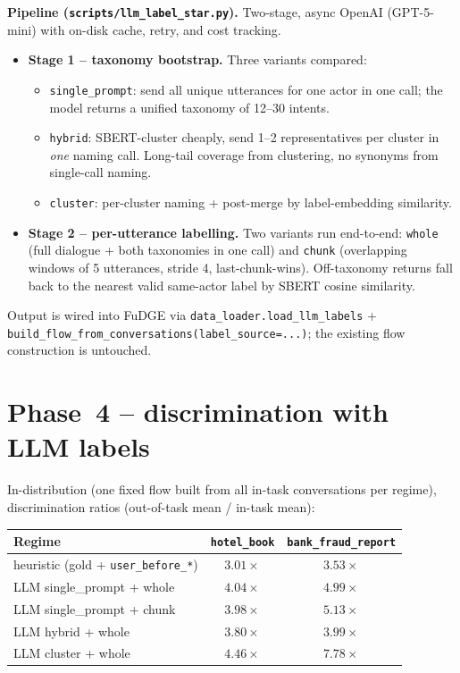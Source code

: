 \documentclass[11pt,a4paper]{article}
\begin{document}
\textbf{Pipeline (\texttt{scripts/llm\_label\_star.py}).} Two-stage, async OpenAI (GPT-5-mini) with on-disk cache, retry, and cost tracking.
\begin{itemize}
    \item \textbf{Stage 1 -- taxonomy bootstrap.} Three variants compared:
    \begin{itemize}
        \item \texttt{single\_prompt}: send all unique utterances for one actor in one call; the model returns a unified taxonomy of 12--30 intents.
        \item \texttt{hybrid}: SBERT-cluster cheaply, send 1--2 representatives per cluster in \emph{one} naming call. Long-tail coverage from clustering, no synonyms from single-call naming.
        \item \texttt{cluster}: per-cluster naming + post-merge by label-embedding similarity.
    \end{itemize}
    \item \textbf{Stage 2 -- per-utterance labelling.} Two variants run end-to-end: \texttt{whole} (full dialogue + both taxonomies in one call) and \texttt{chunk} (overlapping windows of 5 utterances, stride 4, last-chunk-wins). Off-taxonomy returns fall back to the nearest valid same-actor label by SBERT cosine similarity.
\end{itemize}
Output is wired into FuDGE via \texttt{data\_loader.load\_llm\_labels} + \texttt{build\_flow\_from\_conversations(label\_source=...)}; the existing flow construction is untouched.

\section{Phase~4 -- discrimination with LLM labels}

In-distribution (one fixed flow built from all in-task conversations per regime), discrimination ratios (out-of-task mean / in-task mean):

\begin{center}
\begin{tabular}{lcc}
\toprule
Regime & \texttt{hotel\_book} & \texttt{bank\_fraud\_report} \\
\midrule
heuristic (gold + \texttt{user\_before\_*}) & $3.01\times$ & $3.53\times$ \\
LLM single\_prompt + whole & $4.04\times$ & $4.99\times$ \\
LLM single\_prompt + chunk & $3.98\times$ & $5.13\times$ \\
LLM hybrid + whole         & $3.80\times$ & $3.99\times$ \\
LLM cluster + whole        & $\mathbf{4.46\times}$ & $\mathbf{7.78\times}$ \\
\bottomrule
\end{tabular}
\end{center}
\end{document}
